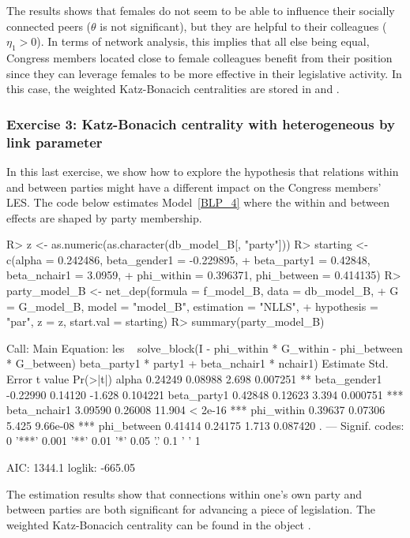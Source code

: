 \documentclass[nojss]{jss}
\begin{document}
%
The results shows that females do not seem to be able to influence their
socially connected peers ($\theta$ is not significant), but they are helpful
to their colleagues ($\eta_{1}>0$).  In terms of network analysis, this
implies that all else being equal, Congress members located close to female
colleagues benefit from their position since they can leverage females to be
more effective in their legislative activity.  In this case, the weighted
Katz-Bonacich centralities are stored in 
and .

\vspace*{-0.15cm}

\subsubsection{Exercise 3: Katz-Bonacich centrality with heterogeneous by link parameter}

In this last exercise, we show how to explore the hypothesis that relations
within and between parties might have a different impact on the Congress
members' LES.  The code below estimates Model~\ref{BLP_4} where the
within and between effects are shaped by party membership.

\vspace*{-0.25cm}

\begin{CodeChunk}
\begin{CodeInput}
R> z <- as.numeric(as.character(db_model_B[, "party"]))
R> starting <- c(alpha = 0.242486, beta_gender1 = -0.229895,
+    beta_party1 = 0.42848, beta_nchair1 = 3.0959,
+    phi_within = 0.396371, phi_between = 0.414135)
R> party_model_B <- net_dep(formula = f_model_B, data = db_model_B,
+    G = G_model_B, model = "model_B", estimation = "NLLS",
+    hypothesis = "par", z = z, start.val = starting)
R> summary(party_model_B)
\end{CodeInput}
\begin{CodeOutput}
Call:
Main Equation:  les ~ solve_block(I - phi_within * G_within - 
phi_between * G_between) %
beta_party1 * party1 + beta_nchair1 * nchair1)
             Estimate Std. Error t value Pr(>|t|)    
alpha         0.24249    0.08988   2.698 0.007251 ** 
beta_gender1 -0.22990    0.14120  -1.628 0.104221    
beta_party1   0.42848    0.12623   3.394 0.000751 ***
beta_nchair1  3.09590    0.26008  11.904  < 2e-16 ***
phi_within    0.39637    0.07306   5.425 9.66e-08 ***
phi_between   0.41414    0.24175   1.713 0.087420 .  
---
Signif. codes:  0 '***' 0.001 '**' 0.01 '*' 0.05 '.' 0.1 ' ' 1

AIC: 1344.1  loglik: -665.05
\end{CodeOutput}
\end{CodeChunk}
%
The estimation results show that connections within one's own party and
between parties are both significant for advancing a piece of legislation. 
The weighted Katz-Bonacich centrality can be found in the object
.
\end{document}
